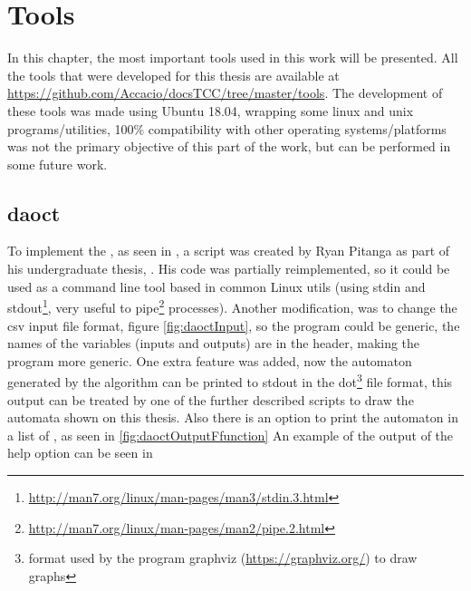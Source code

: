 
\chapter{Tools}
\label{chap:Tools}

In this chapter, the most important tools used in this work will be presented.
All the tools that were developed for this thesis are available at
\url{https://github.com/Accacio/docsTCC/tree/master/tools}. The development of
these tools was made using Ubuntu 18.04, wrapping some linux and unix
programs/utilities, 100\% compatibility with other operating systems/platforms
was not the primary objective of this part of the work, but can be performed in
some future work. 

\section{daoct}
\label{sec:daoct}

To implement the , as seen in
\cite{moreira2018enhanced}, a script was created by Ryan Pitanga as part of his
undergraduate thesis, \cite{pitanga2019modelo}. His code was partially
reimplemented, so it could be used as a command line tool based in common Linux
utils (using stdin and
stdout\footnote{\url{http://man7.org/linux/man-pages/man3/stdin.3.html}}, very
useful to pipe\footnote{\url{http://man7.org/linux/man-pages/man2/pipe.2.html}}
processes). Another modification, was to change the csv input file format,
figure \ref{fig:daoctInput}, so the
program could be generic, the names of the variables (inputs and outputs) are in
the header, making the program more generic. One extra feature was added,
now the automaton generated by the algorithm can be printed to stdout in the
dot\footnote{format used by the program graphviz (\url{https://graphviz.org/})
  to draw graphs} file format, this output can be treated by one of the further
described scripts to draw the automata shown on this thesis. Also there is an option to print
  the automaton in a list of \ffunction, as seen in \ref{fig:daoctOutputFfunction}
An example of the output of the help option can be seen in 
% 

